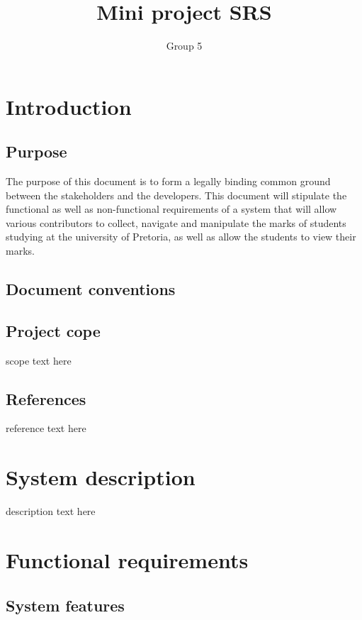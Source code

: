 \documentclass[10pt,a4paper]{article}
\author{Group 5}
\title{Mini project SRS}
\begin{document}
\tableofcontents
\pagebreak
\section{Introduction}
\subsection{Purpose}
The purpose of this document is to form a legally binding common ground between the stakeholders and the developers. This document will stipulate the functional as well as non-functional requirements of a system that will allow various contributors to collect, navigate and manipulate the marks of students studying at the university of Pretoria, as well as allow the students to view their marks.
\subsection{Document conventions}

\subsection{Project cope}
scope text here
\subsection{References}
reference text here
\section{System description}
description text here
\section{Functional requirements}
	\subsection{System features}
\end{document}

